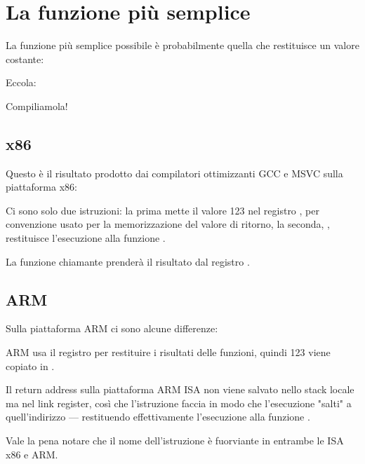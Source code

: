 \section{La funzione più semplice}

La funzione più semplice possibile è probabilmente quella che restituisce un valore costante:

Eccola:



Compiliamola!

\subsection{x86}

Questo è il risultato prodotto dai compilatori ottimizzanti GCC e MSVC sulla piattaforma x86:



Ci sono solo due istruzioni: la prima mette il valore 123 nel registro \EAX, per convenzione usato per la memorizzazione del valore di ritorno, la seconda, \RET, restituisce l'esecuzione alla funzione .

La funzione chiamante prenderà il risultato dal registro \EAX.

\subsection{ARM}

Sulla piattaforma ARM ci sono alcune differenze:



ARM usa il registro  per restituire i risultati delle funzioni, quindi 123 viene copiato in .

Il return address sulla piattaforma ARM \ac{ISA} non viene salvato nello stack locale ma nel link register, 
così che l'istruzione  faccia in modo che l'esecuzione "salti" a quell'indirizzo --- restituendo effettivamente l'esecuzione alla funzione .

Vale la pena notare che il nome dell'istruzione \MOV è fuorviante in entrambe le \ac{ISA} x86 e ARM. 

